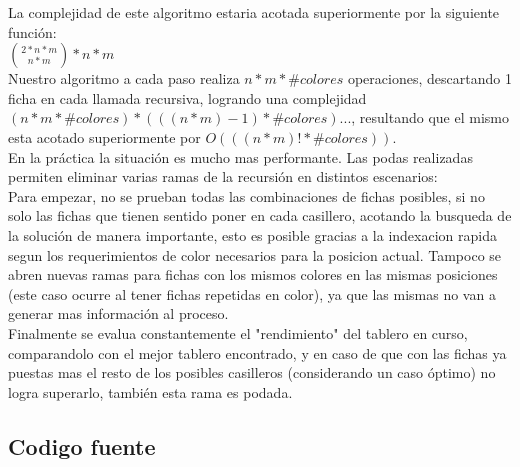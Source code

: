 La complejidad de este algoritmo estaria acotada superiormente por la siguiente funci\'on: \\

${2*n*m \choose n*m} * n*m$ \\

Nuestro algoritmo a cada paso realiza $n*m*\#colores$ operaciones, descartando 1 ficha en cada llamada recursiva, logrando una complejidad  $(n*m*\#colores)*(((n*m)-1)*\#colores)...$, resultando que el mismo esta acotado superiormente por $O(((n*m)!*\#colores))$. \\

En la pr\'actica la situaci\'on es mucho mas performante. Las podas realizadas permiten eliminar varias ramas de la recursi\'on en distintos escenarios:\\

Para empezar, no se prueban todas las combinaciones de fichas posibles, si no solo las fichas que tienen sentido poner en cada casillero, acotando la busqueda de la soluci\'on de manera importante, esto es posible gracias a la indexacion rapida segun los requerimientos de color necesarios para la posicion actual. Tampoco se abren nuevas ramas para fichas con los mismos colores en las mismas posiciones (este caso ocurre al tener fichas repetidas en color), ya que las mismas no van a generar mas informaci\'on al proceso. \\

Finalmente se evalua constantemente el "rendimiento" del tablero en curso, comparandolo con el mejor tablero encontrado, y en caso de que con las fichas ya puestas mas el resto de los posibles casilleros (considerando un caso \'optimo) no logra superarlo, tambi\'en esta rama es podada.

\newpage

\subsection{Codigo fuente}

